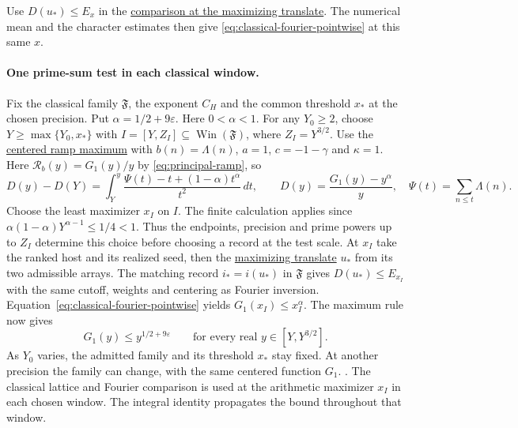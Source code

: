 Use \(D(u_*)\le E_x\) in the
\hyperlink{proof.classical-maximizing-translate}{comparison at the maximizing translate}.
The numerical mean and the character estimates then give
\eqref{eq:classical-fourier-pointwise} at this same \(x\).


\paragraph{One prime-sum test in each classical window.}
%
Fix the classical family \(\mathfrak F\), the exponent \(C_H\) and
the common threshold \(x_*\) at the chosen precision. Put
\(\alpha=1/2+9\varepsilon\). Here \(0<\alpha<1\).
For any \(Y_0\ge2\), choose \(Y\ge\max\{Y_0,x_*\}\) with
\(I=[Y,Z_I]\subseteq\operatorname{Win}(\mathfrak F)\), where
\(Z_I=Y^{3/2}\).
\leavevmode{}%
Use the \hyperlink{proof.centered-ramp-maximum}{centered ramp maximum}
with \(b(n)=\Lambda(n)\), \(a=1\), \(c=-1-\gamma\) and \(\kappa=1\).
Here \(\mathcal R_b(y)=G_1(y)/y\) by \eqref{eq:principal-ramp}, so
\[
 D(y)-D(Y)
 =\int_Y^y\frac{\Psi(t)-t+(1-\alpha)t^\alpha}{t^2}\,dt,
 \qquad
 D(y)=\frac{G_1(y)-y^\alpha}{y},\quad
 \Psi(t)=\sum_{n\le t}\Lambda(n).
\]
Choose the least maximizer \(x_I\) on \(I\).
The finite calculation applies since
\(\alpha(1-\alpha)Y^{\alpha-1}\le 1/4<1\).
Thus the endpoints, precision and prime powers up to \(Z_I\)
determine this choice before choosing a record at the test scale.
At \(x_I\) take the ranked host and its realized seed, then the
\hyperlink{proof.classical-maximizing-translate}{maximizing translate}
\(u_*\) from its two admissible arrays. The matching record
\(i_*=i(u_*)\) in \(\mathfrak F\) gives \(D(u_*)\le E_{x_I}\)
with the same cutoff, weights and centering as Fourier inversion.
Equation~\eqref{eq:classical-fourier-pointwise} yields
\(G_1(x_I)\le x_I^\alpha\). The maximum rule now gives
\begin{equation}
\label{eq:prime-window}
 G_1(y)\le y^{1/2+9\varepsilon}
       \qquad\text{for every real }y\in[Y,Y^{3/2}].
\end{equation}
As \(Y_0\) varies, the admitted family and its threshold \(x_*\)
stay fixed. At another precision the family can change, with the same
centered function \(G_1\).
.
{The classical lattice and Fourier comparison is used at the
arithmetic maximizer \(x_I\) in each chosen window. The integral
identity propagates the bound throughout that window.}

